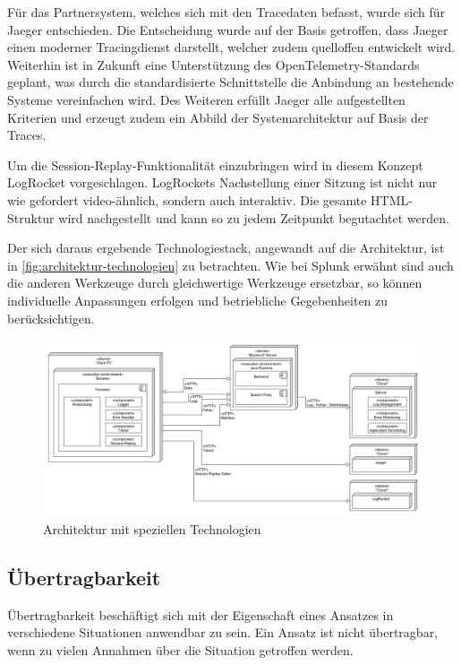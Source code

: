 	Für das Partnersystem, welches sich mit den Tracedaten befasst, wurde sich für Jaeger entschieden. Die Entscheidung wurde auf der Basis getroffen, dass Jaeger einen moderner Tracingdienst darstellt, welcher zudem quelloffen entwickelt wird. Weiterhin ist in Zukunft eine Unterstützung des OpenTelemetry-Standards geplant, was durch die standardisierte Schnittstelle die Anbindung an bestehende Systeme vereinfachen wird. Des Weiteren erfüllt Jaeger alle aufgestellten Kriterien und erzeugt zudem ein Abbild der Systemarchitektur auf Basis der Traces.
	
	Um die Session-Replay-Funktionalität einzubringen wird in diesem Konzept LogRocket vorgeschlagen. LogRockets Nachstellung einer Sitzung ist nicht nur wie gefordert video-ähnlich, sondern auch interaktiv. Die gesamte HTML-Struktur wird nachgestellt und kann so zu jedem Zeitpunkt begutachtet werden.
	
	Der sich daraus ergebende Technologiestack, angewandt auf die Architektur, ist in \autoref{fig:architektur-technologien} zu betrachten. Wie bei Splunk erwähnt sind auch die anderen Werkzeuge durch gleichwertige Werkzeuge ersetzbar, so können individuelle Anpassungen erfolgen und betriebliche Gegebenheiten zu berücksichtigen.
	
\begin{figure}[H]
	\centering
	\includegraphics[width=0.75\linewidth]{img/04_erstellung-poc/konzept-technologien.png}
	\caption{Architektur mit speziellen Technologien}
	\label{fig:architektur-technologien}
\end{figure}

	\subsection{Übertragbarkeit}
	
	Übertragbarkeit beschäftigt sich mit der Eigenschaft eines Ansatzes in verschiedene Situationen anwendbar zu sein. Ein Ansatz ist nicht übertragbar, wenn zu vielen Annahmen über die Situation getroffen werden.
	
